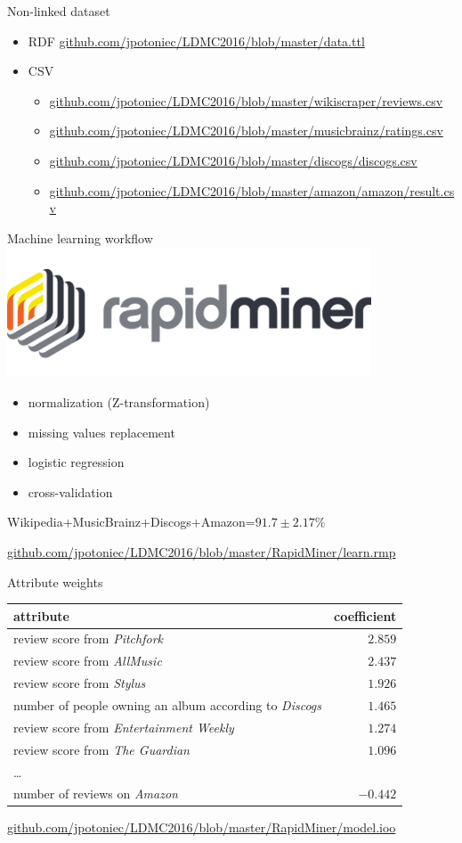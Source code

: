 \documentclass{beamer}
\begin{document}
\begin{frame}{Non-linked dataset}
\begin{itemize}
\item RDF
\url{github.com/jpotoniec/LDMC2016/blob/master/data.ttl}
\item CSV
\begin{itemize}
\item \url{github.com/jpotoniec/LDMC2016/blob/master/wikiscraper/reviews.csv}
\item \url{github.com/jpotoniec/LDMC2016/blob/master/musicbrainz/ratings.csv}
\item \url{github.com/jpotoniec/LDMC2016/blob/master/discogs/discogs.csv}
\item \url{github.com/jpotoniec/LDMC2016/blob/master/amazon/amazon/result.csv}
\end{itemize}
\end{itemize}
\end{frame}

\begin{frame}{Machine learning workflow}
\centering
\includegraphics[width=.5\textwidth]{rapidminer-logo-retina.png}
\pause

\begin{itemize}
\item<+-> normalization (Z-transformation)
\item<+-> missing values replacement
\item<+-> logistic regression
\item<+-> cross-validation
\end{itemize}
\pause
Wikipedia+MusicBrainz+Discogs+Amazon=$91.7\pm 2.17\%$

\vfill
{\small
\url{github.com/jpotoniec/LDMC2016/blob/master/RapidMiner/learn.rmp}
}
\end{frame}

\begin{frame}{Attribute weights}
\begin{tabular}{l|r}
attribute & coefficient \\
\hline
review score from \emph{Pitchfork} & $2.859$ \\
review score from \emph{AllMusic} & $2.437$ \\
review score from \emph{Stylus} & $1.926$ \\
number of people owning an album according to \emph{Discogs} & $1.465$ \\
review score from \emph{Entertainment Weekly} & $1.274$ \\
review score from \emph{The Guardian} & $1.096$ \\
\ldots \\
number of reviews on \emph{Amazon} & $-0.442$
\end{tabular}

\vfill
{\small
\url{github.com/jpotoniec/LDMC2016/blob/master/RapidMiner/model.ioo}
}
\end{frame}
\end{document}
